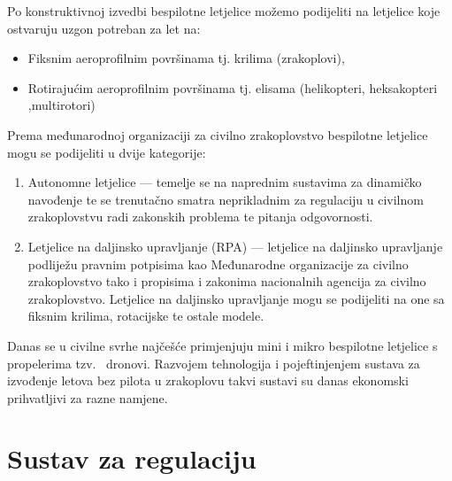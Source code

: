\documentclass[times, utf8, diplomski]{fer}
\begin{document}
Po konstruktivnoj izvedbi bespilotne letjelice možemo podijeliti na letjelice koje ostvaruju uzgon potreban za let na:\begin{itemize}
\item Fiksnim aeroprofilnim površinama tj. krilima (zrakoplovi),
\item Rotirajućim  aeroprofilnim  površinama  tj.  elisama  (helikopteri,  heksakopteri ,multirotori) 
\end{itemize}
Prema  međunarodnoj  organizaciji  za civilno  zrakoplovstvo   bespilotne letjelice mogu se podijeliti u dvije kategorije:\begin{enumerate}
\item Autonomne letjelice --- temelje se na naprednim sustavima za dinamičko navođenje te se trenutačno smatra neprikladnim za regulaciju u civilnom zrakoplovstvu radi zakonskih problema te pitanja odgovornosti.
\item Letjelice na daljinsko upravljanje (RPA) --- letjelice na daljinsko upravljanje podliježu pravnim  potpisima  kao  Međunarodne organizacije  za  civilno  zrakoplovstvo  tako  i propisima  i  zakonima  nacionalnih  agencija  za  civilno  zrakoplovstvo.  Letjelice  na daljinsko upravljanje mogu se podijeliti na one sa fiksnim krilima, rotacijske te ostale modele.
\end{enumerate}
Danas  se  u  civilne  svrhe  najčešće  primjenjuju  mini  i  mikro bespilotne  letjelice  s propelerima  tzv.  ~dronovi.  Razvojem  tehnologija  i  pojeftinjenjem  sustava  za  izvođenje letova  bez  pilota  u  zrakoplovu  takvi  sustavi  su  danas  ekonomski  prihvatljivi  za  razne namjene. 


\section{Sustav za regulaciju}
\end{document}
